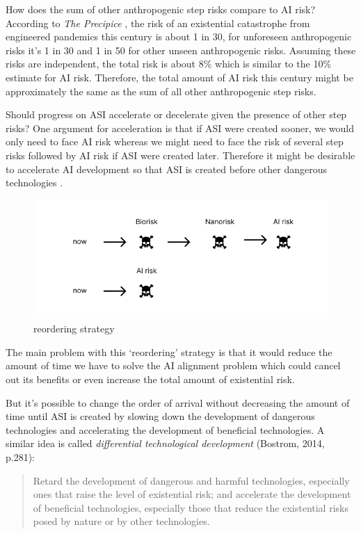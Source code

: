 \documentclass{article}
\begin{document}
How does the sum of other anthropogenic step risks compare to AI risk? According to \textit{The Precipice} \cite{theprecipice}, the risk of an existential catastrophe from engineered pandemics this century is about 1 in 30, for unforeseen anthropogenic risks it’s 1 in 30 and 1 in 50 for other unseen anthropogenic risks. Assuming these risks are independent, the total risk is about 8\% which is similar to the 10\% estimate for AI risk. Therefore, the total amount of AI risk this century might be approximately the same as the sum of all other anthropogenic step risks.

Should progress on ASI accelerate or decelerate given the presence of other step risks? One argument for acceleration is that if ASI were created sooner, we would only need to face AI risk whereas we might need to face the risk of several step risks followed by AI risk if ASI were created later. Therefore it might be desirable to accelerate AI development so that ASI is created before other dangerous technologies \cite{superintelligence}.

\begin{figure}[h]
    \includegraphics[width=12cm]{reordering}
    \centering
    \caption{reordering strategy}
\end{figure}

The main problem with this ‘reordering’ strategy is that it would reduce the amount of time we have to solve the AI alignment problem which could cancel out its benefits or even increase the total amount of existential risk.

But it’s possible to change the order of arrival without decreasing the amount of time until ASI is created by slowing down the development of dangerous technologies and accelerating the development of beneficial technologies. A similar idea is called \textit{differential technological development} (Bostrom, 2014, p.281):

\begin{quote}
Retard the development of dangerous and harmful technologies, especially ones
that raise the level of existential risk; and accelerate the development of
beneficial technologies, especially those that reduce the existential risks posed by nature or by other technologies.
\end{quote}
\end{document}
